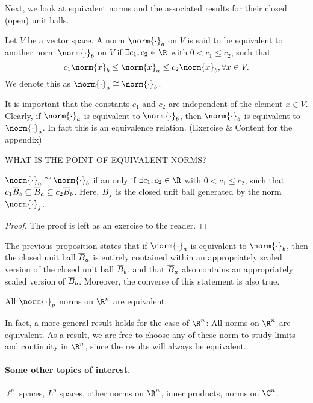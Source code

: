 Next, we look at equivalent norms and the associated results for their closed (open) unit balls.

\begin{ndfn}
  Let $V$ be a vector space. A norm $\norm{\cdot}_a$ on $V$ is said to be equivalent to another norm $\norm{\cdot}_b$ on $V$ if $\exists c_1, c_2 \in \R$ with $0 < c_1 \leq c_2$, such that
  \begin{equation*}
    c_1 \norm{x}_b \leq \norm{x}_a \leq c_2 \norm{x}_b, \forall x \in V.
  \end{equation*}
  We denote this as $\norm{\cdot}_a \cong \norm{\cdot}_b$.
\end{ndfn}
It is important that the constants $c_1$ and $c_2$ are independent of the element $x \in V$. Clearly, if $\norm{\cdot}_a$ is equivalent to $\norm{\cdot}_b$, then $\norm{\cdot}_b$ is equivalent to $\norm{\cdot}_a$. In fact this is an equivalence relation. (Exercise \& Content for the appendix)

WHAT IS THE POINT OF EQUIVALENT NORMS?

\begin{nprop}
  $\norm{\cdot}_a \cong \norm{\cdot}_b$ if an only if $\exists c_1, c_2 \in \R$ with $0 < c_1 \leq c_2$, such that $c_1 \overline{B}_b \subseteq \overline{B}_a \subseteq c_2 \overline{B}_b$. Here, $\overline{B}_j$ is the closed unit ball generated by the norm $\norm{\cdot}_j$.
\end{nprop}
\begin{proof}
  The proof is left as an exercise to the reader.
\end{proof}

The previous proposition states that if $\norm{\cdot}_a$ is equivalent to $\norm{\cdot}_b$, then the closed unit ball $\overline{B}_a$ is entirely contained within an appropriately scaled version of the closed unit ball $\overline{B}_b$, and that $\overline{B}_a$ also contains an appropriately scaled version of $\overline{B}_b$. Moreover, the converse of this statement is also true.

\begin{nthm}
  All $\norm{\cdot}_p$ norms on $\R^n$ are equivalent.
\end{nthm}

In fact, a more general result holds for the case of $\R^n$: All norms on $\R^n$ are equivalent. As a result, we are free to choose any of these norm to study limits and continuity in $\R^n$, since the results will always be equivalent.

\paragraph{Some other topics of interest.} $\ell^p$ spaces, $L^p$ spaces, other norms on $\R^n$, inner products, norms on $\C^n$.